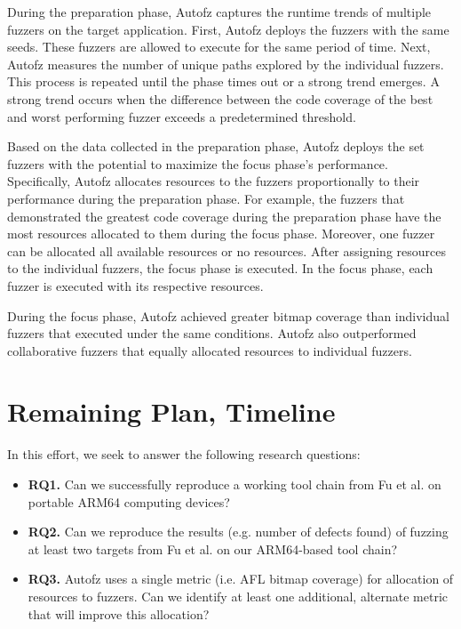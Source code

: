 During the preparation phase, Autofz captures the runtime trends of multiple fuzzers
on the target application. First, Autofz deploys the fuzzers with the same seeds. 
These fuzzers are allowed to execute for the same period of time. Next, Autofz 
measures the number of unique paths explored by the individual fuzzers. This 
process is repeated until the phase times out or a strong trend emerges. A strong 
trend occurs when the difference between the code coverage of the best and worst 
performing fuzzer exceeds a predetermined threshold. 

Based on the data collected in the preparation phase, Autofz deploys 
the set fuzzers with the potential to maximize the focus phase’s performance.
Specifically, Autofz allocates resources to the fuzzers proportionally 
to their performance during the preparation phase. For example, the fuzzers
that demonstrated the greatest code coverage during the preparation phase 
have the most resources allocated to them during the focus phase. Moreover, 
one fuzzer can be allocated all available resources or no resources. After 
assigning resources to the individual fuzzers, the focus phase is executed. In 
the focus phase, each fuzzer is executed with its respective resources.

During the focus phase, Autofz achieved greater bitmap coverage than individual 
fuzzers that executed under the same conditions. Autofz also outperformed 
collaborative fuzzers that equally allocated resources to individual fuzzers. 
\cite{Fu}

\section{Remaining Plan, Timeline}
In this effort, we seek to answer the following research questions:

\begin{itemize}
    \item \textbf{RQ1.} Can we successfully reproduce a working tool chain from 
    Fu et al. \cite{Fu} on portable ARM64 computing devices?
    \item \textbf{RQ2.} Can we reproduce the results (e.g. number of defects found)
     of fuzzing at least two targets from Fu et al. \cite{Fu} on our ARM64-based
      tool chain?
    \item \textbf{RQ3.} Autofz uses a single metric (i.e. AFL bitmap coverage) for
     allocation of resources to fuzzers. Can we identify at least one additional, 
     alternate metric that will improve this allocation?
\end{itemize}

